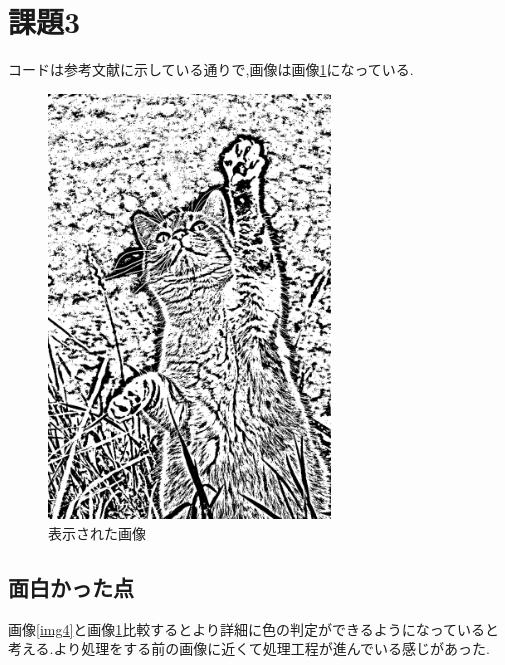 \documentclass[a4paper, 11pt]{jsarticle}
\begin{document}
\section{課題3}
コードは参考文献\cite{three}に示している通りで,画像は画像\ref{img5}になっている.
\begin{figure}[htbp]
  \begin{center}
    \includegraphics[width=75mm]{kirei.jpg}
    \caption{表示された画像}
    \label{img5}
  \end{center}
\end{figure}

\subsection{面白かった点}
画像\ref{img4}と画像\ref{img5}比較するとより詳細に色の判定ができるようになっていると考える.より処理をする前の画像に近くて処理工程が進んでいる感じがあった.
\clearpage
\end{document}
